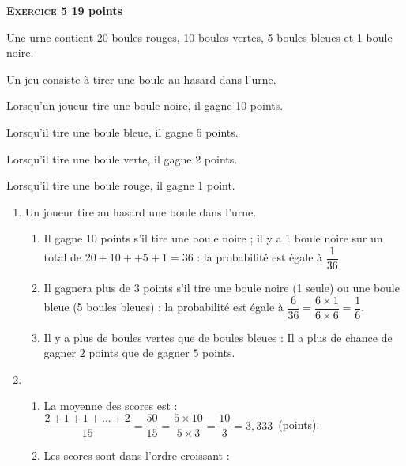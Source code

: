 \textbf{{\large \textsc{Exercice 5}} \hfill 19 points}

\medskip

Une urne contient 20 boules rouges, 10 boules vertes, 5 boules bleues et 1 boule noire.

Un jeu consiste à tirer une boule au hasard dans l'urne.

Lorsqu'un joueur tire une boule noire, il gagne 10 points.

Lorsqu'il tire une boule bleue, il gagne 5 points.

Lorsqu'il tire une boule verte, il gagne 2 points.

Lorsqu'il tire une boule rouge, il gagne 1 point.

\medskip

\begin{enumerate}
\item Un joueur tire au hasard une boule dans l'urne.
	\begin{enumerate}
		\item %
Il gagne 10 points s'il tire une boule noire ; il y a 1 boule noire sur un total de $20 + 10 + + 5 + 1 = 36$ : la probabilité est égale à $\dfrac{1}{36}$.
		\item %
		Il gagnera plus de 3 points s'il tire une boule noire (1 seule) ou une boule bleue (5 boules bleues) : la probabilité est égale à $\dfrac{6}{36} = \dfrac{6 \times 1}{6 \times 6} = \dfrac16$.
		\item %
Il y a plus de boules vertes que de boules bleues : Il a plus de chance de gagner $2$ points que de gagner $5$ points.
	\end{enumerate}	

\item~

	\begin{enumerate}
		\item %
		La moyenne des scores est : $\dfrac{2 + 1 + 1 + \ldots + 2}{15} = \dfrac{50}{15} = \dfrac{5 \times 10}{5 \times 3} = \dfrac{10}{3} = 3,333$~(points).
		\item %
Les scores sont dans l'ordre croissant :
		

\end{enumerate}
\end{enumerate}
